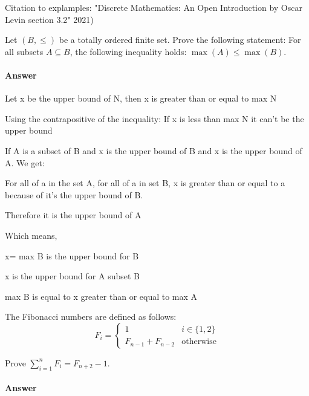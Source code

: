 \documentclass{article}
\begin{document}
{Citation to explamples: "Discrete Mathematics: An Open Introduction by Oscar Levin section 3.2" 2021)


 

Let $(B,\leq)$ be a totally ordered finite set. Prove the following
statement: For all subsets $A \subseteq B$, the following inequality
holds: $\max(A) \leq \max(B)$.

\paragraph{Answer}

{Let x be the upper bound of N, then x is greater than or equal to max N}

{Using the contrapositive of the inequality: If x is less than max N it can't be the upper bound}

{If A is a subset of B and x is the upper bound of B and x is the upper bound of A. We get:}

{For all of a in the set A, for all of a in set B, x is greater than or equal to a because of it's the upper bound of B.}

{Therefore it is the upper bound of A}


{Which means,}


{x= max B is the upper bound for B}

{x is the upper bound for A subset B}

{max B is equal to x greater than or equal to max A}

 

The Fibonacci numbers are defined as follows:
$$
    F_i = \begin{cases}
            1 & i \in \{1,2\} \\
            F_{n-1}+F_{n-2} & \text{otherwise}
          \end{cases}
$$

Prove $\sum_{i=1}^n F_i = F_{n+2}-1$.

\paragraph{Answer}

}
\end{document}
